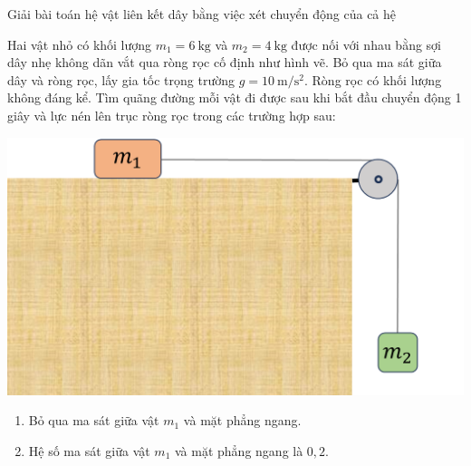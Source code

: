\begin{dang}{Giải bài toán hệ vật liên kết dây bằng việc xét chuyển động của cả hệ}
{Hai vật nhỏ có khối lượng $m_1=\SI{6}{\kilogram}$ và $m_2=\SI{4}{\kilogram}$ được nối với nhau bằng sợi dây nhẹ không dãn vắt qua ròng rọc cố định như hình vẽ. Bỏ qua ma sát giữa dây và ròng rọc, lấy gia tốc trọng trường $g=\SI{10}{\meter/\second^2}$. Ròng rọc có khối lượng không đáng kể. Tìm quãng đường mỗi vật đi được sau khi bắt đầu chuyển động 1 giây và lực nén lên trục ròng rọc trong các trường hợp sau:
	\begin{center}
		\includegraphics[width=0.4\linewidth]{../figs/VN10-2023-PH-TP021-1}
	\end{center}
	\begin{enumerate}[label=\alph*)]
		\item Bỏ qua ma sát giữa vật $m_1$ và mặt phẳng ngang.
		\item Hệ số ma sát giữa vật $m_1$ và mặt phẳng ngang là $0,2$.
	\end{enumerate}
}
{}
\end{dang}
